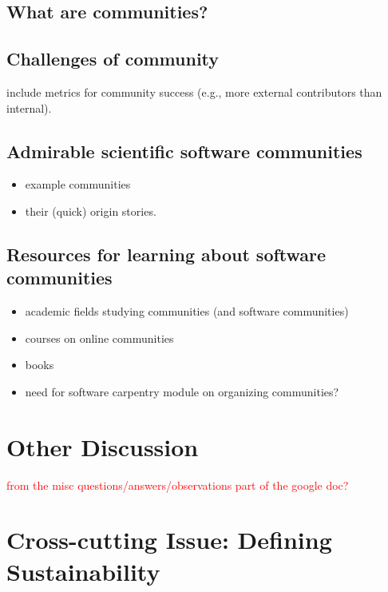 \documentclass[11pt, oneside]{amsart}
\newcommand{\note}[1]{ {\textcolor{red}    { #1 }}}
\begin{document}
\subsection{What are communities?}
\subsection{Challenges of community}
include metrics for community success (e.g., more external contributors than internal).
\subsection{Admirable scientific software communities}
\begin{itemize}
\item example communities
\item their (quick) origin stories.
\end{itemize}
\subsection{Resources for learning about software communities}
\begin{itemize}
\item academic fields studying communities (and software communities)
\item courses on online communities
\item books
\item need for software carpentry module on organizing communities?
\end{itemize}

\section{Other Discussion} \label{sec:other}

\note{from the misc questions/answers/observations part of the google doc?}

\section{Cross-cutting Issue: Defining Sustainability}  \label{sec:cross-cutting}
\end{document}
